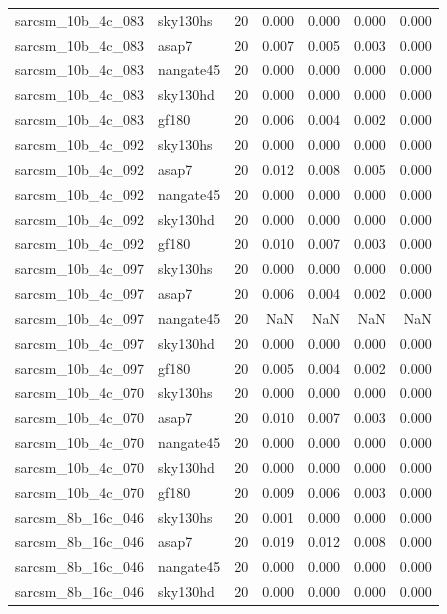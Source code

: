 \begin{tabular}{llrrrrr}
sarcsm\_10b\_4c\_083 & sky130hs & 20 & 0.000 & 0.000 & 0.000 & 0.000 \\
sarcsm\_10b\_4c\_083 & asap7 & 20 & 0.007 & 0.005 & 0.003 & 0.000 \\
sarcsm\_10b\_4c\_083 & nangate45 & 20 & 0.000 & 0.000 & 0.000 & 0.000 \\
sarcsm\_10b\_4c\_083 & sky130hd & 20 & 0.000 & 0.000 & 0.000 & 0.000 \\
sarcsm\_10b\_4c\_083 & gf180 & 20 & 0.006 & 0.004 & 0.002 & 0.000 \\
sarcsm\_10b\_4c\_092 & sky130hs & 20 & 0.000 & 0.000 & 0.000 & 0.000 \\
sarcsm\_10b\_4c\_092 & asap7 & 20 & 0.012 & 0.008 & 0.005 & 0.000 \\
sarcsm\_10b\_4c\_092 & nangate45 & 20 & 0.000 & 0.000 & 0.000 & 0.000 \\
sarcsm\_10b\_4c\_092 & sky130hd & 20 & 0.000 & 0.000 & 0.000 & 0.000 \\
sarcsm\_10b\_4c\_092 & gf180 & 20 & 0.010 & 0.007 & 0.003 & 0.000 \\
sarcsm\_10b\_4c\_097 & sky130hs & 20 & 0.000 & 0.000 & 0.000 & 0.000 \\
sarcsm\_10b\_4c\_097 & asap7 & 20 & 0.006 & 0.004 & 0.002 & 0.000 \\
sarcsm\_10b\_4c\_097 & nangate45 & 20 & NaN & NaN & NaN & NaN \\
sarcsm\_10b\_4c\_097 & sky130hd & 20 & 0.000 & 0.000 & 0.000 & 0.000 \\
sarcsm\_10b\_4c\_097 & gf180 & 20 & 0.005 & 0.004 & 0.002 & 0.000 \\
sarcsm\_10b\_4c\_070 & sky130hs & 20 & 0.000 & 0.000 & 0.000 & 0.000 \\
sarcsm\_10b\_4c\_070 & asap7 & 20 & 0.010 & 0.007 & 0.003 & 0.000 \\
sarcsm\_10b\_4c\_070 & nangate45 & 20 & 0.000 & 0.000 & 0.000 & 0.000 \\
sarcsm\_10b\_4c\_070 & sky130hd & 20 & 0.000 & 0.000 & 0.000 & 0.000 \\
sarcsm\_10b\_4c\_070 & gf180 & 20 & 0.009 & 0.006 & 0.003 & 0.000 \\
sarcsm\_8b\_16c\_046 & sky130hs & 20 & 0.001 & 0.000 & 0.000 & 0.000 \\
sarcsm\_8b\_16c\_046 & asap7 & 20 & 0.019 & 0.012 & 0.008 & 0.000 \\
sarcsm\_8b\_16c\_046 & nangate45 & 20 & 0.000 & 0.000 & 0.000 & 0.000 \\
sarcsm\_8b\_16c\_046 & sky130hd & 20 & 0.000 & 0.000 & 0.000 & 0.000 \\

\end{tabular}
